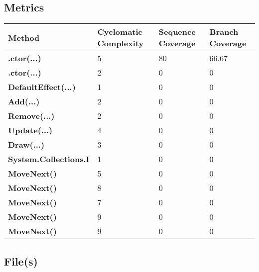 \documentclass[a4paper,10pt]{article}
\begin{document}
\subsection{Metrics}
\begin{longtable}[l]{|l|l|l|l|}
\hline
\textbf{Method} & \textbf{Cyclomatic Complexity} & \textbf{Sequence Coverage} & \textbf{Branch Coverage}\\
\hline
\textbf{.ctor(...)} & 5 & 80 & 66.67\\
\hline
\textbf{.ctor(...)} & 2 & 0 & 0\\
\hline
\textbf{DefaultEffect(...)} & 1 & 0 & 0\\
\hline
\textbf{Add(...)} & 2 & 0 & 0\\
\hline
\textbf{Remove(...)} & 2 & 0 & 0\\
\hline
\textbf{Update(...)} & 4 & 0 & 0\\
\hline
\textbf{Draw(...)} & 3 & 0 & 0\\
\hline
\textbf{System.Collections.I} & 1 & 0 & 0\\
\hline
\textbf{MoveNext()} & 5 & 0 & 0\\
\hline
\textbf{MoveNext()} & 8 & 0 & 0\\
\hline
\textbf{MoveNext()} & 7 & 0 & 0\\
\hline
\textbf{MoveNext()} & 9 & 0 & 0\\
\hline
\textbf{MoveNext()} & 9 & 0 & 0\\
\hline
\end{longtable}
\subsection{File(s)}
\end{document}
